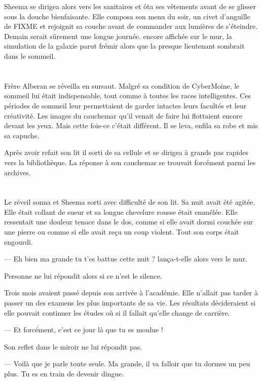 Sheema se dirigea alors vers les sanitaires et ôta ses vêtements avant de se 
glisser sous la douche bienfaisante. Elle composa son menu du soir, un civet
d'anguille de FIXME et rejoignit sa couche avant de commander aux lumières
de s'éteindre. Demain serait sûrement une longue journée. encore affichée sur le
mur, la simulation de la galaxie parut frémir alors que la presque lieutenant
sombrait dans le sommeil.

\section*{}
Frère Alberan se réveilla en sursaut. Malgré sa condition de CyberMoine, le 
sommeil lui était indispensable, tout comme à toutes les races intelligentes.
Ces périodes de sommeil leur permettaient de garder intactes leurs facultés et
leur créativité. Les images du cauchemar qu'il venait de faire lui flottaient
encore devant les yeux. Mais cette fois-ce c'était différent. Il se leva, enfila
sa robe et mis sa capuche.

Après avoir refait son lit il sorti de sa cellule et se dirigea à grands pas 
rapides vers la bibliothèque. La réponse à son cauchemar se trouvait forcément
parmi les archives.

\section*{} 
Le réveil sonna et Sheema sorti avec difficulté de son lit. Sa nuit avait
été agitée. Elle était collant de sueur et sa longue chevelure rousse était
emmêlée. Elle ressentait une douleur tenace dans le dos, comme si elle avait
dormi couchée sur une pierre ou comme si elle avait reçu un coup violent. Tout
son corps était engourdi.

  — Eh bien ma grande tu t'es battue cette nuit ? lança-t-elle alors vers le
mur.

Personne ne lui répondit alors si ce n'est le silence.

Trois mois avaient passé depuis son arrivée à l'académie. Elle n'allait pas 
tarder à passer un des examens les plus importants de sa vie. Les résultats
décideraient si elle pouvait continuer les études où si il fallait qu'elle
change de carrière.

  — Et forcément, c'est ce jour là que tu es moulue !

Son reflet dans le miroir ne lui répondit pas.

  — Voilà que je parle toute seule. Ma grande, il va falloir que tu dormes un
peu plus. Tu es en train de devenir dingue.

